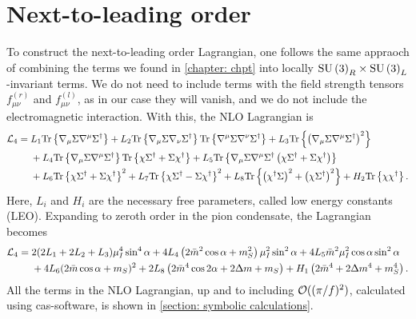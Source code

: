 \section{Next-to-leading order}
\label{section: nlo chpt}


To construct the next-to-leading order Lagrangian, one follows the same appraoch of combining the terms we found in \autoref{chapter: chpt} into locally $\text{SU}\left(3\right)_R\times\text{SU}\left(3\right)_L$-invariant terms.
We do not need to include terms with the field strength tensors $f_{\mu\nu}^{(r)}$ and $f_{\mu\nu}^{(l)}$, as in our case they will vanish, and we do not include the electromagnetic interaction.
With this, the NLO Lagrangian is~\autocite{gasserChiralPerturbationTheory1985}
%
\begin{align}
    \label{NLO Lagrangian three flavor}
    \nonumber
    \mathcal{L}_4 
    ={} &
    L_1\text{Tr} \left\{ \nabla_\mu \Sigma \nabla^\mu \Sigma^\dagger \right\}
    + L_2 \text{Tr} \left\{ \nabla_\mu \Sigma \nabla_\nu \Sigma^\dagger \right\} 
    \text{Tr} \left\{ \nabla^\mu \Sigma \nabla^\nu \Sigma^\dagger \right\}
    + L_3 \text{Tr} \left\{ \left(\nabla_\mu \Sigma \nabla^\mu \Sigma^\dagger\right)^2 \right\} \\ \nonumber
    & + L_4 \text{Tr} \left\{ \nabla_\mu \Sigma \nabla^\mu \Sigma^\dagger \right\} 
    \text{Tr} \left\{ \chi \Sigma^\dagger + \Sigma \chi^\dagger \right\}
    + L_5 \text{Tr} \left\{ 
        \nabla_\mu \Sigma \nabla^\mu \Sigma^\dagger 
        \left(\chi \Sigma^\dagger + \Sigma \chi^\dagger\right)
     \right\}\\
    &+ L_6 \text{Tr} \left\{ \chi \Sigma^\dagger + \Sigma \chi^\dagger \right\}^2 
     + L_7 \text{Tr} \left\{ \chi \Sigma^\dagger - \Sigma \chi^\dagger \right\}^2
    + L_8 \text{Tr} \left\{  \left(\chi^\dagger \Sigma \right)^2 + \left(\chi \Sigma^\dagger \right)^2 \right\}
    + H_2 \text{Tr} \left\{ \chi \chi^\dagger \right\}.
\end{align}
%
Here, $L_i$ and $H_i$ are the necessary free parameters, called low energy constants (LEO).
Expanding to zeroth order in the pion condensate, the Lagrangian  becomes
%
\begin{align}
    \nonumber
    \mathcal{L}_4
    = {}&
    2(2L_1 + 2L_2 + L_3) \mu_I^4 \sin^4\alpha
    + 4  L_4 \left( 2 \bar m^2 \cos\alpha + m_S^2 \right) \mu_I^2\sin^2\alpha
    + 4 L_5 \bar m^2 \mu_I^2 \cos\alpha \sin^2 \alpha 
    \\ & 
    + 4 L_6 (2\bar m\cos\alpha + m_S)^2
    + 2 L_8 \left(2 \bar m^4 \cos2\alpha + 2 \Delta m + m_S\right)
    + H_1 \left(2\bar m^4 + 2\Delta m^4 + m_S^4 \right).
\end{align}
%
All the terms in the NLO Lagrangian, up and to including  $\mathcal O((\pi/f)^2)$, calculated using cas-software, is shown in \autoref{section: symbolic calculations}.

